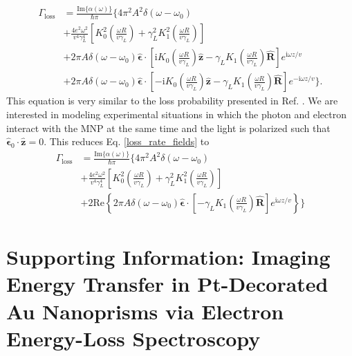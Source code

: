 \documentclass [11pt, proquest] {uwthesis}[2016/11/22]
\begin{document}
\begin{equation}
\begin{aligned}
\Gamma_{\textrm{loss}} &= \frac{\textrm{Im}\{\alpha(\omega)\}}{\hbar\pi}\Big\{4\pi^2A^2\delta(\omega-\omega_0)\\
&+ \frac{4e^2\omega^2}{v^4\gamma_L^4}\left[K_0^2\left(\frac{\omega R}{v\gamma_L}\right) + \gamma_L^2 K_1^2\left(\frac{\omega R}{v\gamma_L}\right)\right]\\
&+ 2\pi A\delta(\omega-\omega_0)\hat{\boldsymbol{\epsilon}}\cdot\left[ \textrm{i}K_0\left( \frac{\omega R}{v\gamma_L} \right)\hat{\textbf{z}} - \gamma_L K_1\left( \frac{\omega R}{v\gamma_L} \right)\hat{\textbf{R}}\right]e^{\textrm{i}\omega z/v}\\
&+ 2\pi A\delta(\omega-\omega_0)\hat{\boldsymbol{\epsilon}}\cdot\left[ -\textrm{i}K_0\left( \frac{\omega R}{v\gamma_L} \right)\hat{\textbf{z}} - \gamma_L K_1\left( \frac{\omega R}{v\gamma_L} \right)\hat{\textbf{R}}\right]e^{-\textrm{i}\omega z/v} \Big\}.
\label{loss_rate_fields}
\end{aligned}
\end{equation}
This equation is very similar to the loss probability presented in Ref. \cite{vanAiken}. We are interested in modeling experimental situations in which the photon and electron interact with the MNP at the same time and the light is polarized such that $\hat{\boldsymbol{\epsilon}}_0 \cdot \hat{\textbf{z}} = 0$. This reduces Eq. \ref{loss_rate_fields} to
\begin{equation}
\begin{aligned}
\Gamma_{\textrm{loss}} &= \frac{\textrm{Im}\{\alpha(\omega)\}}{\hbar\pi}\Big\{4\pi^2A^2\delta(\omega-\omega_0)\\
&+ \frac{4e^2\omega^2}{v^4\gamma_L^4}\left[K_0^2\left(\frac{\omega R}{v\gamma_L}\right) + \gamma_L^2 K_1^2\left(\frac{\omega R}{v\gamma_L}\right)\right]\\
&+ 2\textrm{Re}\left\{2\pi A\delta(\omega-\omega_0)\hat{\boldsymbol{\epsilon}}\cdot\left[ -\gamma_L K_1\left( \frac{\omega R}{v\gamma_L} \right)\hat{\textbf{R}}\right]e^{\textrm{i}\omega z/v}\right\}\Big\}
\label{loss_fields_realpart}
\end{aligned}
\end{equation}

%
\appendix
\raggedbottom\sloppy
 
\chapter{Supporting Information: Imaging Energy Transfer in Pt-Decorated Au Nanoprisms via Electron Energy-Loss Spectroscopy}
\end{document}
